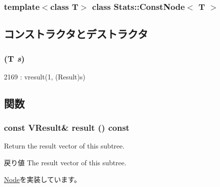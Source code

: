 \subsubsection*{template$<$class T$>$ class Stats::ConstNode$<$ T $>$}



\subsection{コンストラクタとデストラクタ}
\hypertarget{classStats_1_1ConstNode_a215ea66be073f183a06875674898b1cd}{
\subsubsection[{ConstNode}]{ (T {\em s})}}
\label{classStats_1_1ConstNode_a215ea66be073f183a06875674898b1cd}



\begin{DoxyCode}
2169 : vresult(1, (Result)s) {}
\end{DoxyCode}


\subsection{関数}
\hypertarget{classStats_1_1ConstNode_aba312f9e3431b1652f8b3ddf3fe105dc}{
\subsubsection[{result}]{\setlength{\rightskip}{0pt plus 5cm}const {\bf VResult}\& result () const}}
\label{classStats_1_1ConstNode_aba312f9e3431b1652f8b3ddf3fe105dc}
Return the result vector of this subtree. \begin{DoxyReturn}{戻り値}
The result vector of this subtree. 
\end{DoxyReturn}


\hyperlink{classStats_1_1Node_a7fcf57115122663db42f39cc18ca0f62}{Node}を実装しています。


